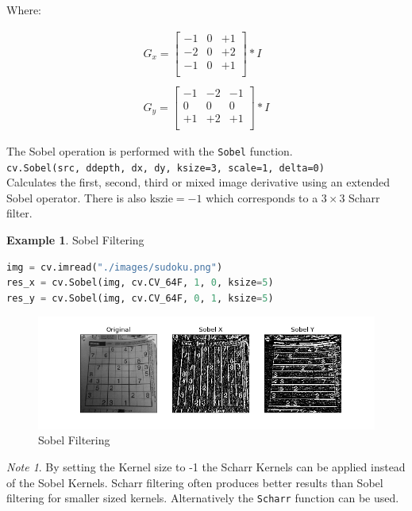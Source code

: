 \documentclass{article}
\theoremstyle{definition}
\newtheorem{ex}{Example}[subsection]
\theoremstyle{remark}
\newtheorem*{nb}{Note}
\newcommand{\func}[2]{\noindent\lstinline{#1}\\#2}
\begin{document}
\noindent Where:

\begin{gather*}
    G_x = \begin{bmatrix}
	-1 & 0 & +1 \\
	-2 & 0 & +2 \\
	-1 & 0 & +1 \\
    \end{bmatrix} * I \\ \\
    G_y = \begin{bmatrix}
	-1 & -2 & -1 \\
	 0 &  0 &  0 \\
	+1 & +2 & +1 \\
    \end{bmatrix} * I
\end{gather*}

\noindent The Sobel operation is performed with the \lstinline{Sobel} function.\\

\func{cv.Sobel(src, ddepth, dx, dy, ksize=3, scale=1, delta=0)}{Calculates the first, second, third or mixed image derivative using an extended Sobel operator. There is also $ \text{kszie}=-1 $ which corresponds to a $ 3 \times 3 $ Scharr filter.}

\begin{ex} Sobel Filtering
\begin{lstlisting}[language=Python]
img = cv.imread("./images/sudoku.png")
res_x = cv.Sobel(img, cv.CV_64F, 1, 0, ksize=5)
res_y = cv.Sobel(img, cv.CV_64F, 0, 1, ksize=5)
\end{lstlisting}
\begin{figure}[H]
    \centering
    \includegraphics[width=\textwidth]{ocv_sobel}
    \caption{Sobel Filtering}
    \label{fig:ocv_sobel}
\end{figure}
\end{ex}

\begin{nb}
    By setting the Kernel size to -1 the Scharr Kernels can be applied instead of the Sobel Kernels. Scharr filtering often produces better results than Sobel filtering for smaller sized kernels. Alternatively the \lstinline{Scharr} function can be used.
\end{nb}
\end{document}
